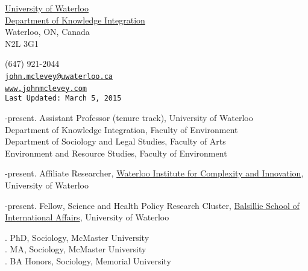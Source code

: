 \documentclass[9pt,usenames,dvipsnames]{article}
\makeatletter
\def\myemail{john.mclevey@uwaterloo.ca}
\def\myweb{www.johnmclevey.com}
\def\myphone{(647) 921-2044}
\def\lastupdated{Last Updated: March 5, 2015}
\makeatother
\begin{document}
\begin{minipage}[t]{2.95in}
 \flushright \footnotesize \href{https://uwaterloo.ca/}{University of Waterloo} \\  \href{https://uwaterloo.ca/knowledge-integration/faculty-mclevey}{Department of Knowledge Integration} \\ Waterloo, ON, Canada \\ N2L 3G1\\
  \end{minipage}
\hfill
\hfill
\begin{minipage}[t]{1.7in}
  \flushright \footnotesize \myphone\, \faPhone \\
  {\texttt{\href{mailto:\myemail}{\myemail}} \, \faEnvelope} \\
  {\texttt{\href{\myweb}{\myweb}} \, \faGlobe} \\
  {\texttt{\lastupdated}}\\
\end{minipage}


\bigskip

\reversemarginpar

\bigskip
{}
\smallskip
{}-present. Assistant Professor (tenure track), University of Waterloo \\
\noindent Department of Knowledge Integration, Faculty of Environment \\
\noindent Department of Sociology and Legal Studies, Faculty of Arts \\
\noindent Environment and Resource Studies, Faculty of Environment \\
\smallskip


-present. Affiliate Researcher, \href{http://wici.ca/new/}{Waterloo Institute for Complexity and Innovation}, University of Waterloo

-present. Fellow, Science and Health Policy Research Cluster, \href{http://www.balsillieschool.ca/}{Balsillie School of International Affairs}, University of Waterloo \\


. PhD, Sociology, McMaster University \\
. MA, Sociology, McMaster University \\
. BA Honors, Sociology, Memorial University \\
\end{document}
